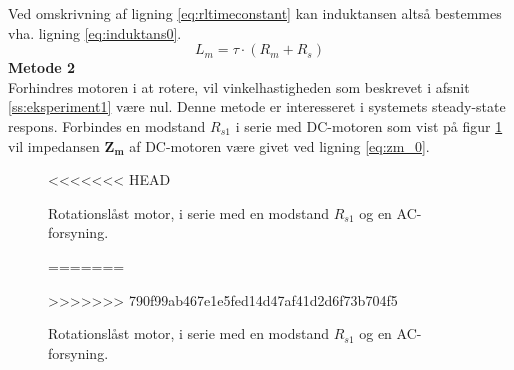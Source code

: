 Ved omskrivning af ligning \ref{eq:rltimeconstant} kan induktansen altså bestemmes vha. ligning \ref{eq:induktans0}.
\begin{equation}
	L_m=\tau\cdot(R_m+R_s)
	\label{eq:induktans0} 
 \end{equation}
\textbf{Metode 2}\\
Forhindres motoren i at rotere, vil vinkelhastigheden som beskrevet i afsnit \ref{ss:eksperiment1} være nul.
Denne metode er interesseret i systemets steady-state respons.
Forbindes en modstand \(R_{s1}\) i serie med DC-motoren som vist på figur \ref{fig:eksperiment2metode2}
vil impedansen \(\mathbf{Z_m}\) af DC-motoren være givet ved ligning \ref{eq:zm_0}.
\begin{figure}[!th]
\centering
\begin{circuitikz}
  
\end{circuitikz}
<<<<<<< HEAD
\caption[Rotationslåst motor med $R_s1$]{Rotationslåst motor, i serie med en modstand \(R_{s1}\) og en AC-forsyning.}
=======
%
\caption[Rotationslåst motor med $R_s1$]{Rotationslåst motor, i serie med en modstand \(R_{s1}\) og en AC-forsyning.}
>>>>>>> 790f99ab467e1e5fed14d47af41d2d6f73b704f5
\label{fig:eksperiment2metode2}
\end{figure}


